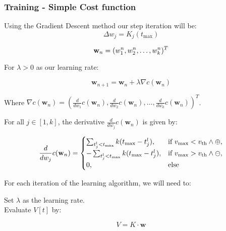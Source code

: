 \subsubsection{Training - Simple Cost function}

\begin{mdframed}[backgroundcolor=red_background, linecolor=black, linewidth=2pt, frametitle=\textbf{Statement}]
\begin{center}

    \label{st:GD-simple-medel}
    Using the Gradient Descent method our step iteration will be:
    \begin{equation}
        \Delta w_j = K_j(t_{\text{max}})
    \end{equation}

\end{center}
\end{mdframed}

\begin{equation}
\mathbf{w}_n = (w_1^n, w_2^n, \ldots, w_k^n)^T \notag
\end{equation}

For $\lambda > 0$ as our learning rate:

\begin{equation}
\mathbf{w}_{n+1} = \mathbf{w}_n + \lambda \nabla c(\mathbf{w}_n)
\end{equation}

Where $\nabla c(\mathbf{w}_n) = \left(\frac{d}{dw_1} c(\mathbf{w}_n), \frac{d}{dw_2} c(\mathbf{w}_n), \ldots, \frac{d}{dw_k} c(\mathbf{w}_n)\right)^T$.

For all $j \in [1, k]$, the derivative $\frac{d}{dw_j} c(\mathbf{w}_n)$ is given by:

\begin{equation}
    \frac{d}{dw_j} c(\mathbf{w}_n) = 
    \begin{cases}
    \sum_{t_j^l < t_{\text{max}}} k(t_{\text{max}} - t_j^l), & \text{if } v_{\text{max}} < v_{\text{th}} \land \oplus, \cr
    -\sum_{t_j^l < t_{\text{max}}} k(t_{\text{max}} - t_j^l), & \text{if } v_{\text{max}} > v_{\text{th}} \land \ominus, \cr
    0, & \text{else}
    \end{cases}
\end{equation}

For each iteration of the learning algorithm, we will need to:

Set $\lambda$ as the learning rate. \\
Evaluate $V[t]$ by: 

\begin{equation}
    V = K \cdot \mathbf{w}
\end{equation}

